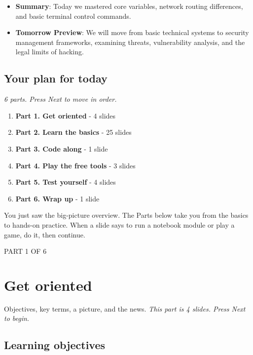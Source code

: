 \documentclass[12pt,openany]{book}
\begin{document}
\begin{itemize}

  \item \textbf{Summary}: Today we mastered core variables, network routing differences, and basic terminal control commands.

  \item \textbf{Tomorrow Preview}: We will move from basic technical systems to security management frameworks, examining threats, vulnerability analysis, and the legal limits of hacking.

\end{itemize}

\medskip

\subsection*{Your plan for today}
{\small\itshape\color{gray}6 parts. Press Next to move in order.}


\begin{enumerate}
  \item \textbf{Part 1. Get oriented} - 4 slides
  \item \textbf{Part 2. Learn the basics} - 25 slides
  \item \textbf{Part 3. Code along} - 1 slide
  \item \textbf{Part 4. Play the free tools} - 3 slides
  \item \textbf{Part 5. Test yourself} - 4 slides
  \item \textbf{Part 6. Wrap up} - 1 slide
\end{enumerate}

You just saw the big-picture overview. The Parts below take you from the basics to hands-on practice. When a slide says to run a notebook module or play a game, do it, then continue.

\medskip

\vspace{4pt}\noindent\textsc{PART 1 OF 6}


\section*{Get oriented}

Objectives, key terms, a picture, and the news.
{\small\itshape\color{gray}This part is 4 slides. Press Next to begin.}

\medskip

\subsection*{Learning objectives}
\end{document}
